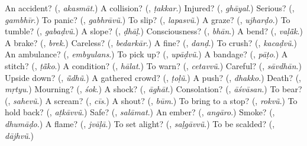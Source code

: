 \begin{tcolorbox}[breakable,colback=teal!4,colframe=teal!35!black,title={Before you move on}]
An accident? (\textbf{}, \emph{akasmāt}.) A collision? (\textbf{}, \emph{ṭakkar}.) Injured? (\textbf{}, \emph{ghāyal}.) Serious? (\textbf{}, \emph{gambhīr}.) To panic? (\textbf{}, \emph{gabhrāvũ}.) To slip? (\textbf{}, \emph{lapasvũ}.) A graze? (\textbf{}, \emph{ujharḍo}.) To tumble? (\textbf{}, \emph{gabaḍvũ}.) A slope? (\textbf{}, \emph{ḍhāḷ}.) Consciousness? (\textbf{}, \emph{bhān}.) A bend? (\textbf{}, \emph{vaḷā̃k}.) A brake? (\textbf{}, \emph{brek}.) Careless? (\textbf{}, \emph{bedarkār}.) A fine? (\textbf{}, \emph{danḍ}.) To crush? (\textbf{}, \emph{kacaḍvũ}.) An ambulance? (\textbf{}, \emph{embyulans}.) To pick up? (\textbf{}, \emph{upāḍvũ}.) A bandage? (\textbf{}, \emph{pāṭo}.) A stitch? (\textbf{}, \emph{ṭā̃ko}.) A condition? (\textbf{}, \emph{hālat}.) To warn? (\textbf{}, \emph{cetavvũ}.) Careful? (\textbf{}, \emph{sāvdhān}.) Upside down? (\textbf{}, \emph{ū̃dhũ}.) A gathered crowd? (\textbf{}, \emph{ṭoḷũ}.) A push? (\textbf{}, \emph{dhakko}.) Death? (\textbf{}, \emph{mṛtyu}.) Mourning? (\textbf{}, \emph{śok}.) A shock? (\textbf{}, \emph{āghāt}.) Consolation? (\textbf{}, \emph{āśvāsan}.) To bear? (\textbf{}, \emph{sahevũ}.) A scream? (\textbf{}, \emph{cīs}.) A shout? (\textbf{}, \emph{būm}.) To bring to a stop? (\textbf{}, \emph{rokvũ}.) To hold back? (\textbf{}, \emph{aṭkāvvũ}.) Safe? (\textbf{}, \emph{salāmat}.) An ember? (\textbf{}, \emph{angāro}.) Smoke? (\textbf{}, \emph{dhumāḍo}.) A flame? (\textbf{}, \emph{jvāḷā}.) To set alight? (\textbf{}, \emph{saḷgāvvũ}.) To be scalded? (\textbf{}, \emph{dājhvũ}.)
\end{tcolorbox}
